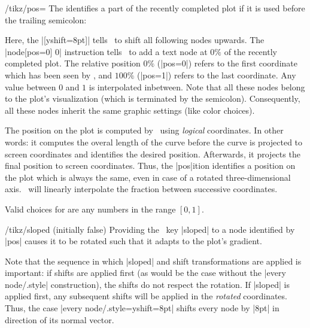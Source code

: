 \begin{key}{/tikz/pos=}
	The  identifies a part of the recently completed plot if it is used before the trailing semicolon:
\begin{codeexample}[]
\end{codeexample}
\noindent Here, the |[yshift=8pt]| tells \Tikz\ to shift all following nodes upwards. The |node[pos=0] {$0$}| instruction tells \Tikz\ to add a text node at $0\%$ of the recently completed plot. The relative position $0\%$ (|pos=0|) refers to the first coordinate which has been seen by \PGFPlots, and $100\%$ (|pos=1|) refers to the last coordinate. Any value between $0$ and $1$ is interpolated inbetween. Note that all these nodes belong to the plot's visualization (which is terminated by the semicolon). Consequently, all these nodes inherit the same graphic settings (like color choices).

	The position on the plot is computed by \PGFPlots\ using \emph{logical} coordinates. In other words: it computes the overal length of the curve before the curve is projected to screen coordinates and identifies the desired position. Afterwards, it projects the final position to screen coordinates. Thus, the |pos|ition identifies a position on the plot which is always the same, even in case of a rotated three-dimensional axis. \PGFPlots\ will linearly interpolate the fraction between successive coordinates.

	Valid choices for  are any numbers in the range $[0,1]$.
\end{key}

\begin{key}{/tikz/sloped (initially false)}
	Providing the \Tikz\ key |sloped| to a node identified by |pos| causes it to be rotated such that it adapts to the plot's gradient.
\begin{codeexample}[]
\end{codeexample}
	Note that the sequence in which |sloped| and shift transformations are applied is important: if shifts are applied first (as would be the case without the |every node/.style| construction), the shifts do not respect the rotation. If |sloped| is applied first, any subsequent shifts will be applied in the \emph{rotated} coordinates. Thus, the case |every node/.style={yshift=8pt}| shifts every node by |8pt| in direction of its normal vector.
\end{key}

